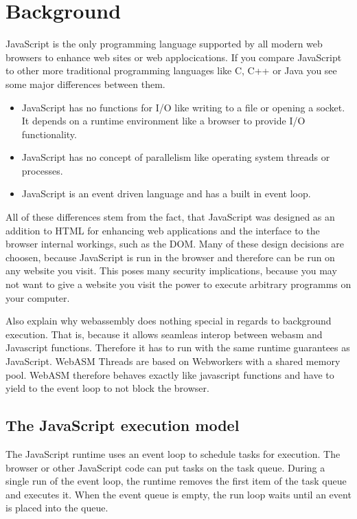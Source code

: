 \documentclass[article,type=bsc,colorback,accentcolor=tud9c]{tudthesis}
\begin{document}
  
  \newpage
  \section{Background}

  JavaScript is the only programming language supported by all modern web browsers to enhance web sites or web applocications. If you compare JavaScript to other more traditional programming languages like C, C++ or Java you see some major differences between them.

  \begin{itemize}
  \item JavaScript has no functions for I/O like writing to a file or opening a socket. It depends on a runtime environment like a browser to provide I/O functionality.
  \item JavaScript has no concept of parallelism like operating system threads or processes.
  \item JavaScript is an event driven language and has a built in event loop.
  \end{itemize}

  All of these differences stem from the fact, that JavaScript was designed as an addition to HTML for enhancing web applications and the interface to the browser internal workings, such as the DOM. Many of these design decisions are choosen, because JavaScript is run in the browser and therefore can be run on any website you visit. This poses many security implications, because you may not want to give a website you visit the power to execute arbitrary programms on your computer.

  Also explain why webassembly does nothing special in regards to background execution. That is, because it allows seamleas interop between webasm and Javascript functions. Therefore it has to run with the same runtime guarantees as JavaScript. WebASM Threads are based on Webworkers with a shared memory pool.
  WebASM therefore behaves exactly like javascript functions and have to yield to the event loop to not block the browser.

  
  \subsection{The JavaScript execution model}
  
  
  The JavaScript runtime uses an event loop to schedule tasks for execution\autocite{mdn-event-loop}. The browser or other JavaScript code can put tasks on the task queue. During a single run of the event loop, the runtime removes the first item of the task queue and executes it. When the event queue is empty, the run loop waits until an event is placed into the queue.
\end{document}
